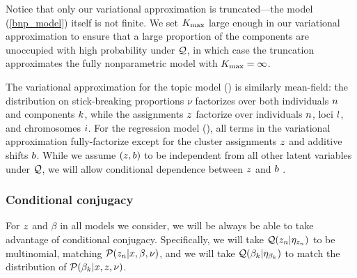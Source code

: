 Notice that only our variational approximation is truncated---the model
(\eqref{bnp_model}) itself is not finite.
We set ${K_{\mathrm{max}}}$ large enough in our variational approximation to ensure that a large
proportion of the components are unoccupied with high probability under $\mathcal{Q}$,
in which case the truncation approximates the fully nonparametric model with ${K_{\mathrm{max}}} = \infty$.

The variational approximation for the topic model ()
is similarly mean-field: the distribution on stick-breaking proportions $\nu$
factorizes over
both individuals $n$ and components $k$, while the
assignments $z$
factorize over individuals $n$, loci $l$, and chromosomes $i$.
For the regression model (), all terms in the
variational approximation fully-factorize
except for the cluster assignments $z$ and additive shifts $b$.
While we assume $(z, b)$ to be independent from all other latent variables
under $\mathcal{Q}$, we will allow conditional dependence between $z$ and $b$ .

\subsubsection{Conditional conjugacy}

For $z$ and $\beta$ in all models we consider, we will be always be able to
take advantage of conditional conjugacy. Specifically, we will take $\mathcal{Q}(z_{n}
\vert \eta_{z_n})$ to be multinomial, matching $\mathcal{P}(z_{n}
\vert x, \beta, \nu)$, and we will take $\mathcal{Q}(\beta_k \vert \eta_{\beta_k})$
to match the distribution of $\mathcal{P}(\beta_{k} \vert x, z, \nu)$.



